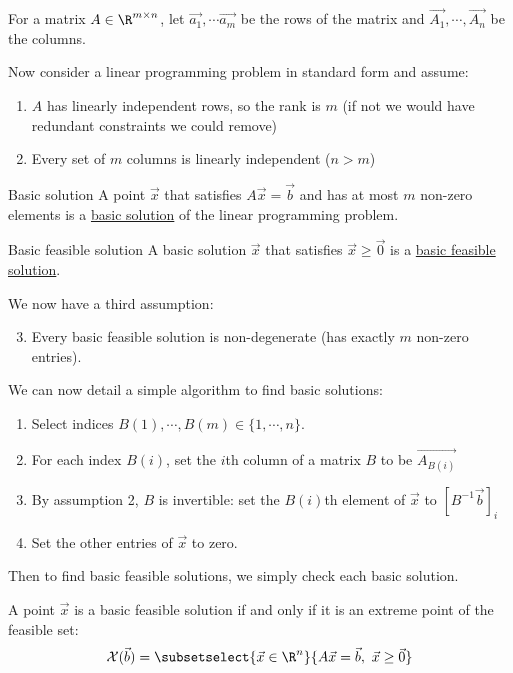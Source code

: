 \documentclass[../Main.tex]{subfiles}
\begin{document}
For a matrix $A \in \R^{m \times n}$, let $\vec{a_{1}}, \cdots \vec{a_{m}}$ be the rows of the matrix and $\vec{A_{1}}, \cdots, \vec{A_{n}}$ be the columns.

Now consider a linear programming problem in standard form and assume:
\begin{enumerate}
    \item $A$ has linearly independent rows, so the rank is $m$ (if not we would have redundant constraints we could remove)
    \item Every set of $m$ columns is linearly independent ($n > m$)
\end{enumerate}
\begin{definition}{Basic solution}
    A point $\vec{x}$ that satisfies $A\vec{x} = \vec{b}$ and has at most $m$ non-zero elements is a \underline{basic solution} of the linear programming problem.
\end{definition}
\begin{definition}{Basic feasible solution}
    A basic solution $\vec{x}$ that satisfies $\vec{x} \geq \vec0$ is a \underline{basic feasible solution}.
\end{definition}
We now have a third assumption:
\begin{enumerate}
    \setcounter{enumi}{2}
    \item Every basic feasible solution is non-degenerate (has exactly $m$ non-zero entries).
\end{enumerate}
We can now detail a simple algorithm to find basic solutions:
\begin{enumerate}
    \item Select indices $B(1), \cdots, B(m) \in \{1, \cdots, n\}$.
    \item For each index $B(i)$, set the $i$th column of a matrix $B$ to be $\vec{A_{B(i)}}$
    \item By assumption 2, $B$ is invertible: set the $B(i)$th element of $\vec{x}$ to $[B^{-1}\vec{b}]_i$
    \item Set the other entries of $\vec{x}$ to zero.
\end{enumerate}
Then to find basic feasible solutions, we simply check each basic solution.
\begin{theorem}
    A point $\vec{x}$ is a basic feasible solution if and only if it is an extreme point of the feasible set:
    \begin{equation*}
        \Xset(\vec{b}) = \subsetselect{\vec{x} \in \R^n}{A\vec{x} = \vec{b},~\vec{x} \geq \vec{0}}
    \end{equation*}
    \label{thmBFSIsExtreme}
\end{theorem}
\end{document}
